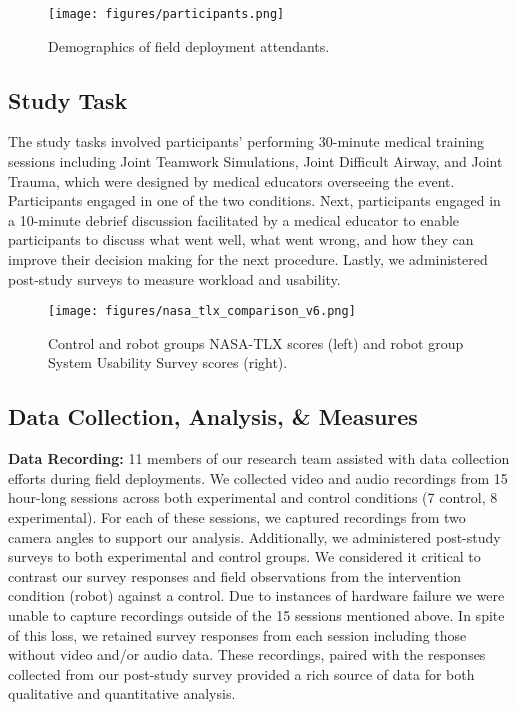 \begin{figure}[t]
    \centering
 \texttt{[image: figures/participants.png]}
    \caption{Demographics of field deployment attendants.} 
    \label{fig:participants}
\end{figure}



\subsection{Study Task} 

The study tasks involved participants’ performing 30-minute medical training sessions including Joint Teamwork Simulations, Joint Difficult Airway, and Joint Trauma, which were designed by medical educators overseeing the event.
Participants engaged in one of the two conditions.
Next, participants engaged in a 10-minute debrief discussion facilitated by a medical educator to enable participants to discuss what went well, what went wrong, and how they can improve their decision making for the next procedure.
Lastly, we administered post-study surveys to measure workload and usability.

\begin{figure*}[t] 
	\centering 
	\texttt{[image: figures/nasa\_tlx\_comparison\_v6.png]} 
	\caption{Control and robot groups NASA-TLX \cite{hart2006nasa} scores (left) and robot group System Usability Survey scores \cite{brooke1996sus} (right).}%
	\label{fig:robot-sus-nasa} 
\end{figure*}


\subsection{Data Collection, Analysis, \& Measures} 

\textbf{Data Recording:} 11 members of our research team assisted with data collection efforts during field deployments. We collected video and audio recordings from 15 hour-long sessions across both experimental and control conditions (7 control, 8 experimental). For each of these sessions, we captured recordings from two camera angles to support our analysis. Additionally, we administered post-study surveys to both experimental and control groups. We considered it critical to contrast our survey responses and field observations from the intervention condition (robot) against a control. Due to instances of hardware failure we were unable to capture recordings outside of the 15 sessions mentioned above. In spite of this loss, we retained survey responses from each session including those without video and/or audio data. These recordings, paired with the responses collected from our post-study survey provided a rich source of data for both qualitative and quantitative analysis. 


